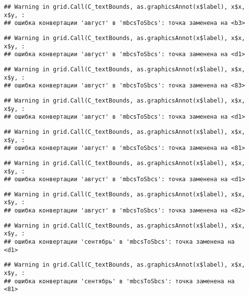 \documentclass[
]{article}
\begin{document}
\begin{verbatim}
## Warning in grid.Call(C_textBounds, as.graphicsAnnot(x$label), x$x, x$y, :
## ошибка конвертации 'август' в 'mbcsToSbcs': точка заменена на <b3>
\end{verbatim}

\begin{verbatim}
## Warning in grid.Call(C_textBounds, as.graphicsAnnot(x$label), x$x, x$y, :
## ошибка конвертации 'август' в 'mbcsToSbcs': точка заменена на <d1>
\end{verbatim}

\begin{verbatim}
## Warning in grid.Call(C_textBounds, as.graphicsAnnot(x$label), x$x, x$y, :
## ошибка конвертации 'август' в 'mbcsToSbcs': точка заменена на <83>
\end{verbatim}

\begin{verbatim}
## Warning in grid.Call(C_textBounds, as.graphicsAnnot(x$label), x$x, x$y, :
## ошибка конвертации 'август' в 'mbcsToSbcs': точка заменена на <d1>
\end{verbatim}

\begin{verbatim}
## Warning in grid.Call(C_textBounds, as.graphicsAnnot(x$label), x$x, x$y, :
## ошибка конвертации 'август' в 'mbcsToSbcs': точка заменена на <81>
\end{verbatim}

\begin{verbatim}
## Warning in grid.Call(C_textBounds, as.graphicsAnnot(x$label), x$x, x$y, :
## ошибка конвертации 'август' в 'mbcsToSbcs': точка заменена на <d1>
\end{verbatim}

\begin{verbatim}
## Warning in grid.Call(C_textBounds, as.graphicsAnnot(x$label), x$x, x$y, :
## ошибка конвертации 'август' в 'mbcsToSbcs': точка заменена на <82>
\end{verbatim}

\begin{verbatim}
## Warning in grid.Call(C_textBounds, as.graphicsAnnot(x$label), x$x, x$y, :
## ошибка конвертации 'сентябрь' в 'mbcsToSbcs': точка заменена на <d1>
\end{verbatim}

\begin{verbatim}
## Warning in grid.Call(C_textBounds, as.graphicsAnnot(x$label), x$x, x$y, :
## ошибка конвертации 'сентябрь' в 'mbcsToSbcs': точка заменена на <81>
\end{verbatim}
\end{document}
